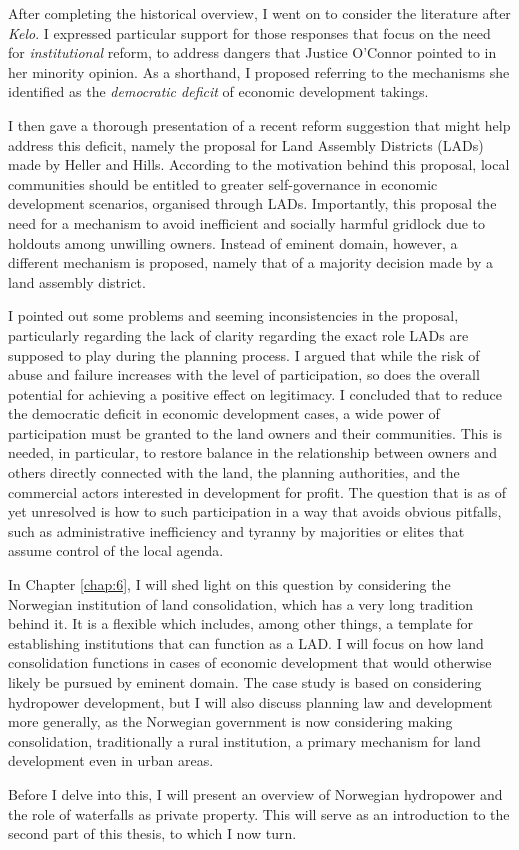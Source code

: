 After completing the historical overview, I went on to consider the literature after {\it Kelo}. I expressed particular support for those responses that focus on the need for {\it institutional} reform, to address  dangers that Justice O'Connor pointed to in her minority opinion. As a shorthand, I proposed referring to the mechanisms she identified as the {\it democratic deficit} of economic development takings. 

I then gave a thorough presentation of a recent reform suggestion that might help address this deficit, namely the proposal for Land Assembly Districts (LADs) made by Heller and Hills. According to the motivation behind this proposal, local communities should be entitled to greater self-governance in economic development scenarios, organised through LADs. Importantly, this proposal  the need for a mechanism to avoid inefficient and socially harmful gridlock due to holdouts among unwilling owners. Instead of eminent domain, however, a different mechanism is proposed, namely that of a majority decision made by a land assembly district.

I pointed out some problems and seeming inconsistencies in the proposal, particularly regarding the lack of clarity regarding the exact role LADs are supposed to play during the planning process. I argued that while the risk of abuse and failure increases with the level of participation, so does the overall potential for achieving a positive effect on legitimacy. I concluded that to reduce the democratic deficit in economic development cases, a wide power of participation must be granted to the land owners and their communities. This is needed, in particular, to restore balance in the relationship between owners and others directly connected with the land, the planning authorities, and the commercial actors interested in development for profit. The question that is as of yet unresolved is how to  such participation in a way that avoids obvious pitfalls, such as administrative inefficiency and tyranny by majorities or elites that assume control of the local agenda.

In Chapter \ref{chap:6}, I will shed light on this question by considering the Norwegian institution of land consolidation, which has a very long tradition behind it. It is a flexible  which includes, among other things, a template for establishing institutions that can function as a LAD. I will focus on how land consolidation functions in cases of economic development that would otherwise likely be pursued by eminent domain. The case study is based on considering hydropower development, but I will also discuss planning law and development more generally, as the Norwegian government is now considering making consolidation, traditionally a rural institution, a primary mechanism for land development even in urban areas.

Before I delve into this, I will present an overview of Norwegian hydropower and the role of waterfalls  as private property. This will serve as an introduction to the second part of this thesis, to which I now turn.